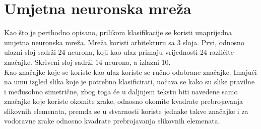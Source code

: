 \documentclass[times, utf8, zavrsni, numeric]{fer}
\begin{document}
\section{Umjetna neuronska mreža}
Kao što je perthodno opisano, prilikom klasifikacije se koristi unaprijedna umjetna neuronska mreža. 
Mreža koristi arhitekturu sa $3$ sloja.
Prvi, odnosno ulazni sloj sadrži $24$ neurona, koji kao ulaz primaju vrijednosti $24$ različite značajke.
Skriveni sloj sadrži $14$ neurona, a izlazni $10$.\\

Kao značajke koje se koriste kao ulaz koriste se ručno odabrane značajke. 
Imajući na umu izgled slika koje je potrebno klasificirati, uočava se kako su slike pravilne i međusobno simetrične, zbog toga će u daljnjem tekstu biti navedene samo značajke koje koriste okomite zrake, odnosno okomite kvadrate prebrojavanja slikovnih elemenata, premda se u stvarnosti koriste jednake takve značajke i za vodoravne zrake odnosno kvadrate prebrojavanja slikovnih elemenata.\\
\end{document}
